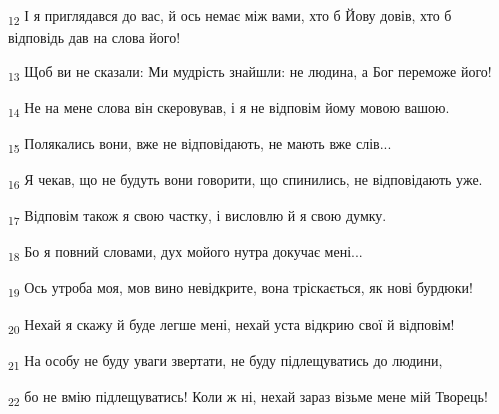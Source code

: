 \begin{tcolorbox}
\textsubscript{12} І я приглядався до вас, й ось немає між вами, хто б Йову довів, хто б відповідь дав на слова його!
\end{tcolorbox}
\begin{tcolorbox}
\textsubscript{13} Щоб ви не сказали: Ми мудрість знайшли: не людина, а Бог переможе його!
\end{tcolorbox}
\begin{tcolorbox}
\textsubscript{14} Не на мене слова він скеровував, і я не відповім йому мовою вашою.
\end{tcolorbox}
\begin{tcolorbox}
\textsubscript{15} Полякались вони, вже не відповідають, не мають вже слів...
\end{tcolorbox}
\begin{tcolorbox}
\textsubscript{16} Я чекав, що не будуть вони говорити, що спинились, не відповідають уже.
\end{tcolorbox}
\begin{tcolorbox}
\textsubscript{17} Відповім також я свою частку, і висловлю й я свою думку.
\end{tcolorbox}
\begin{tcolorbox}
\textsubscript{18} Бо я повний словами, дух мойого нутра докучає мені...
\end{tcolorbox}
\begin{tcolorbox}
\textsubscript{19} Ось утроба моя, мов вино невідкрите, вона тріскається, як нові бурдюки!
\end{tcolorbox}
\begin{tcolorbox}
\textsubscript{20} Нехай я скажу й буде легше мені, нехай уста відкрию свої й відповім!
\end{tcolorbox}
\begin{tcolorbox}
\textsubscript{21} На особу не буду уваги звертати, не буду підлещуватись до людини,
\end{tcolorbox}
\begin{tcolorbox}
\textsubscript{22} бо не вмію підлещуватись! Коли ж ні, нехай зараз візьме мене мій Творець!
\end{tcolorbox}
